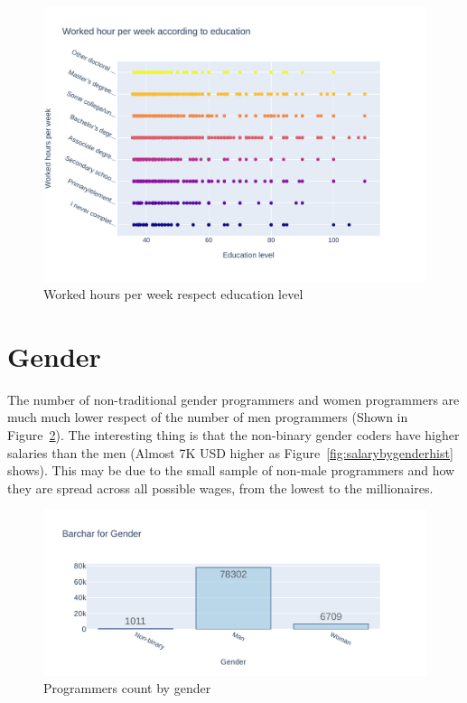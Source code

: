 \documentclass{article}
\begin{document}
    \begin{figure}[ht]
        \centering
        \includegraphics[height=0.4\textheight]{images/WorkedHours_EdLevel.pdf}
        \caption{Worked hours per week respect education level}
        \label{fig:workedhours}
    \end{figure}

\clearpage
\section{Gender}
The number of non-traditional gender programmers and women programmers are much much lower respect of the number of men programmers (Shown in Figure~\ref{fig:gendercount}). The interesting thing is that the non-binary gender coders have higher salaries than the men (Almost 7K USD higher as  Figure~\ref{fig:salarybygenderhist} shows). This may be due to the small sample of non-male programmers and how they are spread across all possible wages, from the lowest to the millionaires.
\begin{figure}[ht]
    \centering
    \includegraphics[width=\textwidth]{images/gender_count.pdf}
    \caption{Programmers count by gender}
    \label{fig:gendercount}
\end{figure}{}
\end{document}
